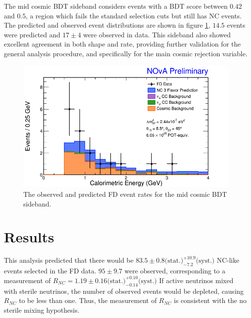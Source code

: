 The mid cosmic BDT sideband considers events with a BDT score between $0.42$ and $0.5$, a region which fails the standard selection cuts but still has NC events. The predicted and observed event distributions are shown in figure \ref{fig:SidebandMidBDT}, $14.5$ events were predicted and $17 \pm 4$ were observed in data. This sideband also showed excellent agreement in both shape and rate, providing further validation for the general analysis procedure, and specifically for the main cosmic rejection variable.
\begin{figure}[htbp]
  \centering
  \includegraphics[width=1\textwidth]{figures/Ana01Results/FDMidBDTCalEDataMCStack.png}
  \caption[Mid Cosmic BDT Sideband]{The observed and predicted FD event rates for the mid cosmic BDT sideband.}
  \label{fig:SidebandMidBDT}
\end{figure}

\section{Results}
\label{sec:ResultsFD}

This analysis predicted that there would be $83.5 \pm 0.8 \mbox{(stat.)} ^{+10.9}_{-7.2} \mbox{(syst.)}$ NC-like events selected in the FD data. $95 \pm 9.7$ were observed, corresponding to a measurement of $R_{NC} = 1.19 \pm 0.16 \mbox{(stat.)} ^{+0.10}_{-0.14} \mbox{(syst.)}$ If active neutrinos mixed with sterile neutrinos, the number of observed events would be depleted, causing $R_{NC}$ to be less than one. Thus, the measurement of $R_{NC}$ is consistent with the no sterile mixing hypothesis.

